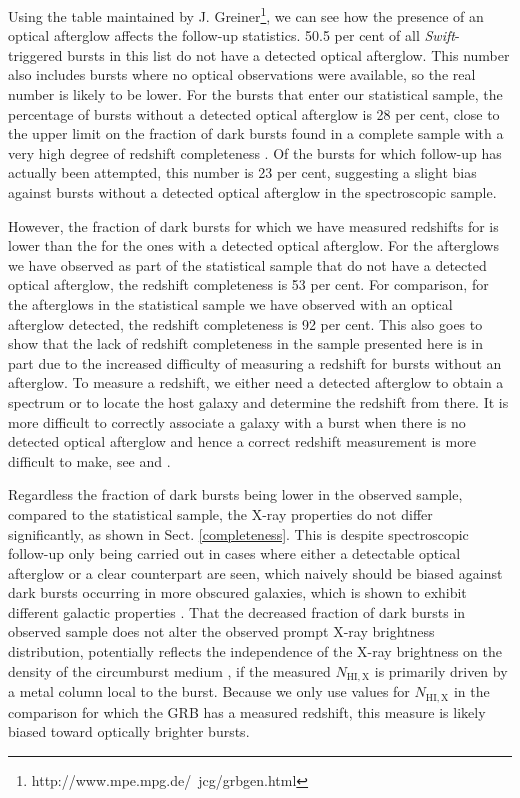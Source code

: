 \documentclass{aa}    %
\begin{document}
Using the table maintained by
J. Greiner\footnote{http://www.mpe.mpg.de/~jcg/grbgen.html}, we can see how the
presence of an optical afterglow affects the follow-up statistics. 50.5 per cent
of all \textit{Swift}-triggered bursts in this list do not have a detected
optical afterglow. This number also includes bursts where no optical
observations were available, so the real number is likely to be lower. For the
bursts that enter our statistical sample, the percentage of bursts without a
detected optical afterglow is 28 per cent, close to the upper limit on the
fraction of dark bursts found in a complete sample with a very high degree of
redshift completeness \citep{Melandri2012}. Of the bursts for which follow-up
has actually been attempted, this number is 23 per cent, suggesting a slight
bias against bursts without a detected optical afterglow in the spectroscopic
sample.

However, the fraction of dark bursts for which we have measured redshifts for is
lower than the for the ones with a detected optical afterglow. For the
afterglows we have observed as part of the statistical sample that do not have a
detected optical afterglow, the redshift completeness is 53 per cent. For
comparison, for the afterglows in the statistical sample we have observed with
an optical afterglow detected, the redshift completeness is 92 per cent. This
also goes to show that the lack of redshift completeness in the sample presented
here is in part due to the increased difficulty of measuring a redshift for
bursts without an afterglow. To measure a redshift, we either need a detected
afterglow to obtain a spectrum or to locate the host galaxy and determine the
redshift from there. It is more difficult to correctly associate a galaxy with a
burst when there is no detected optical afterglow and hence a correct redshift
measurement is more difficult to make, see \citet{Jakobsson2005, Levesque2010}
and \citet{Perley2017}.

Regardless the fraction of dark bursts being lower in the observed sample,
compared to the statistical sample, the X-ray properties do not differ
significantly, as shown in Sect. \ref{completeness}. This is despite
spectroscopic follow-up only being carried out in cases where either a
detectable optical afterglow or a clear counterpart are seen, which naively
should be biased against dark bursts occurring in more obscured galaxies, which
is shown to exhibit different galactic properties \citep{Perley2009,
	Kruhler2011, Rossi2012, Perley2013b, Perley2015b}. That the decreased fraction
of dark bursts in observed sample does not alter the observed prompt X-ray
brightness distribution, potentially reflects the independence of the X-ray
brightness on the density of the circumburst medium \citep{Freedman2001,
	Berger2003, Nysewander2009}, if the measured $N_{\mathrm{HI, X}}$ is primarily
driven by a metal column local to the burst. Because we only use values for
$N_{\mathrm{HI, X}}$ in the comparison for which the GRB has a measured
redshift, this measure is likely biased toward optically brighter bursts.
\end{document}
